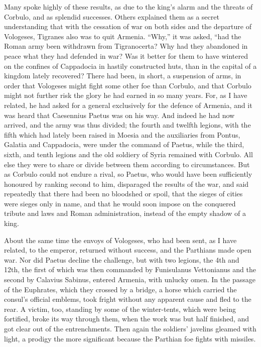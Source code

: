 Many spoke highly of these results, as due to the king's alarm and the threats of Corbulo, and as splendid successes. Others explained them as a secret understanding that with the cessation of war on both sides and the departure of Vologeses, Tigranes also was to quit Armenia. ``Why,'' it was asked, ``had the Roman army been withdrawn from Tigranocerta? Why had they abandoned in peace what they had defended in war? Was it better for them to have wintered on the confines of Cappadocia in hastily constructed huts, than in the capital of a kingdom lately recovered? There had been, in short, a suspension of arms, in order that Vologeses might fight some other foe than Corbulo, and that Corbulo might not further risk the glory he had earned in so many years. For, as I have related, he had asked for a general exclusively for the defence of Armenia, and it was heard that Caesennius Paetus was on his way. And indeed he had now arrived, and the army was thus divided; the fourth and twelfth legions, with the fifth which had lately been raised in Moesia and the auxiliaries from Pontus, Galatia and Cappadocia, were under the command of Paetus, while the third, sixth, and tenth legions and the old soldiery of Syria remained with Corbulo. All else they were to share or divide between them according to circumstances. But as Corbulo could not endure a rival, so Paetus, who would have been sufficiently honoured by ranking second to him, disparaged the results of the war, and said repeatedly that there had been no bloodshed or spoil, that the sieges of cities were sieges only in name, and that he would soon impose on the conquered tribute and laws and Roman administration, instead of the empty shadow of a king.


About the same time the envoys of Vologeses, who had been sent, as I have related, to the emperor, returned without success, and the Parthians made open war. Nor did Paetus decline the challenge, but with two legions, the 4th and 12th, the first of which was then commanded by Funisulanus Vettonianus and the second by Calavius Sabinus, entered Armenia, with unlucky omen. In the passage of the Euphrates, which they crossed by a bridge, a horse which carried the consul's official emblems, took fright without any apparent cause and fled to the rear. A victim, too, standing by some of the winter-tents, which were being fortified, broke its way through them, when the work was but half finished, and got clear out of the entrenchments. Then again the soldiers' javelins gleamed with light, a prodigy the more significant because the Parthian foe fights with missiles.

